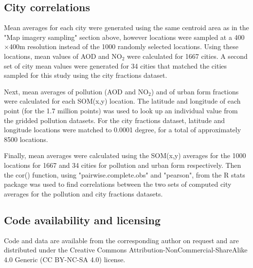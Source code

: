 \documentclass[9pt,twocolumn,twoside,lineno]{pnas-new}
\begin{document}
{\subsection*{City correlations}\label{correlations}
Mean averages for each city were generated using the same centroid area as in the "Map imagery sampling" section above, however locations were sampled at a 400$\times$400m resolution instead of the 1000 randomly selected locations. Using these locations, mean values of AOD and NO$_{2}$ were calculated for 1667 cities. A second set of city mean values were generated for 34 cities that matched the cities sampled for this study using the city fractions dataset.

Next, mean averages of pollution (AOD and NO$_{2}$) and of urban form fractions were calculated for each SOM(x,y) location. The latitude and longitude of each point (for the 1.7 million points) was used to look up an individual value from the gridded pollution datasets. For the city fractions dataset, latitude and longitude locations were matched to 0.0001 degree, for a total of approximately 8500 locations.

Finally, mean averages were calculated using the SOM(x,y) averages for the 1000 locations for 1667 and 34 cities for pollution and urban form respectively. Then the cor() function, using "pairwise.complete.obs" and "pearson", from the R stats package\cite{RCoreTeam2015} was used to find correlations between the two sets of computed city averages for the pollution and city fractions datasets.

\subsection*{Code availability and licensing}\label{sec:available}
Code and data are available from the corresponding author on request and are distributed under the Creative Commons Attribution-NonCommercial-ShareAlike 4.0 Generic (CC BY-NC-SA 4.0) license.







} %







\showmatmethods{} %


\showacknow{} %


\end{document}
